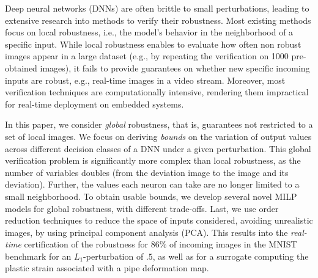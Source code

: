 Deep neural networks (DNNs) are often brittle to small perturbations, leading to extensive research into methods to verify their robustness. Most existing methods focus on local robustness, i.e., the model's behavior in the neighborhood of a specific input. While local robustness enables to evaluate how often non robust images appear in a large dataset (e.g., by repeating the verification on 1000 pre-obtained images), it fails to provide guarantees on whether new specific incoming inputs are robust, e.g., real-time images in a video stream. Moreover, most verification techniques are computationally intensive, rendering them impractical for real-time deployment on embedded systems. 

In this paper, we consider {\em global} robustness, that is, guarantees not restricted to a set of local images. We focus on deriving {\em bounds} on the variation of output values across different decision classes of a DNN under a given perturbation. This global verification problem is significantly more complex than local robustness, as the number of variables doubles (from the deviation image to the image and its deviation). Further, the values each neuron can take are no longer limited to a small neighborhood. To obtain usable bounds, we develop several novel  MILP models for global robustness, with different trade-offs. Last, we use order reduction techniques to reduce the space of inputs considered, avoiding unrealistic images, by using principal component analysis (PCA). This results into the {\em real-time} certification of the robustness for $86\%$ of incoming images in the MNIST benchmark for an $L_1$-perturbation of $.5$, as well as for a surrogate computing the 
plastic strain associated with a pipe deformation map.